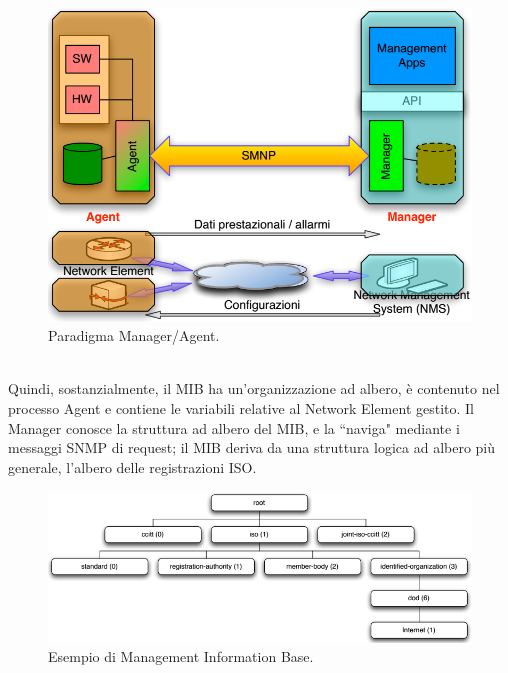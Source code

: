 \begin{figure}[htbp]
	\centering
	\includegraphics[scale = 0.45]{images/SNMP-complete}
	\caption{Paradigma Manager/Agent.}
	\label{img:SNMP-complete}
\end{figure}\\
Quindi, sostanzialmente, il MIB ha un'organizzazione ad albero, è contenuto nel processo Agent e contiene le variabili relative al Network Element gestito. Il Manager conosce la struttura ad albero del MIB, e la \textquotedblleft naviga" mediante i messaggi SNMP di request; il MIB deriva da una struttura logica ad albero più generale, l'albero delle registrazioni ISO.
\begin{figure}[htbp]
	\centering
	\includegraphics[scale = 0.55]{images/MIB-example}
	\caption{Esempio di Management Information Base.}
	\label{img:MIB-example}
\end{figure}\\
